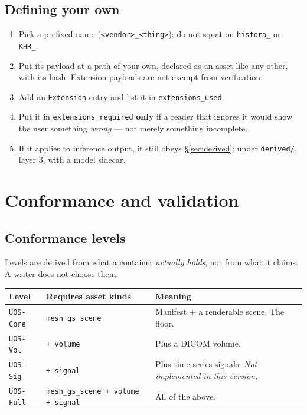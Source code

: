 \documentclass[11pt,a4paper]{article}
\newcommand{\code}[1]{\texttt{\small #1}}
\begin{document}
\subsection{Defining your own}

\begin{enumerate}
  \item Pick a prefixed name (\code{<vendor>\_<thing>}); do not squat on \code{histora\_} or
  \code{KHR\_}.
  \item Put its payload at a path of your own, declared as an asset like any other, with
  its hash. Extension payloads are not exempt from verification.
  \item Add an \code{Extension} entry and list it in \code{extensions\_used}.
  \item Put it in \code{extensions\_required} \textbf{only} if a reader that ignores it
  would show the user something \emph{wrong} --- not merely something incomplete.
  \item If it applies to inference output, it still obeys \S\ref{sec:derived}: under
  \code{derived/}, layer 3, with a model sidecar.
\end{enumerate}

\section{Conformance and validation}\label{sec:conformance}

\subsection{Conformance levels}

Levels are derived from what a container \emph{actually holds}, not from what it claims. A
writer does not choose them.

\begin{longtable}{L{2.8cm} L{4.4cm} L{7.8cm}}
\toprule
\textbf{Level} & \textbf{Requires asset kinds} & \textbf{Meaning}\\
\midrule
\endhead
\code{UOS-Core} & \code{mesh\_gs\_scene} & Manifest + a renderable scene. The floor.\\
\code{UOS-Vol} & \code{+ volume} & Plus a DICOM volume.\\
\code{UOS-Sig} & \code{+ signal} & Plus time-series signals. \emph{Not implemented in
this version.}\\
\code{UOS-Full} & \code{mesh\_gs\_scene + volume + signal} & All of the above.\\
\bottomrule
\end{longtable}
\end{document}
